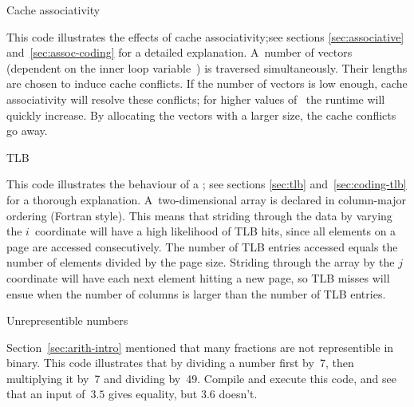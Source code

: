  {Cache associativity}
\label{sec:assoc-code}

This code illustrates the effects of cache associativity;see sections
\ref{sec:associative} and~\ref{sec:assoc-coding} for a detailed
explanation. A~number of vectors (dependent on the inner loop
variable~) is traversed simultaneously.  Their lengths are
chosen to induce cache conflicts. If the number of vectors is low
enough, cache associativity will resolve these conflicts; for higher
values of~ the runtime will quickly increase. By allocating the
vectors with a larger size, the cache conflicts go away.

\begingroup\small

\endgroup

 {TLB}
\label{sec:tlb-code}

This code illustrates the behaviour of a ; see sections
\ref{sec:tlb} and~\ref{sec:coding-tlb} for a thorough
explanation. A~two-dimensional array is declared in column-major
ordering (Fortran style). This means that striding through the data by
varying the $i$~coordinate will have a high likelihood of TLB hits,
since all elements on a page are accessed consecutively. The number of
TLB entries accessed equals the number of elements divided by the page
size. Striding through the array by the $j$ coordinate will have each
next element hitting a new page, so TLB misses will ensue when the
number of columns is larger than the number of TLB entries.

\begingroup\small

\endgroup

 {Unrepresentible numbers}
\label{sec:fraction-code}

Section~\ref{sec:arith-intro} mentioned that many fractions are not
representible in binary. This code illustrates that by dividing a
number first by~7, then multiplying it by~7 and dividing
by~49. Compile and execute this code, and see that an input of~$3.5$
gives equality, but $3.6$ doesn't.

\begingroup\small

\endgroup
